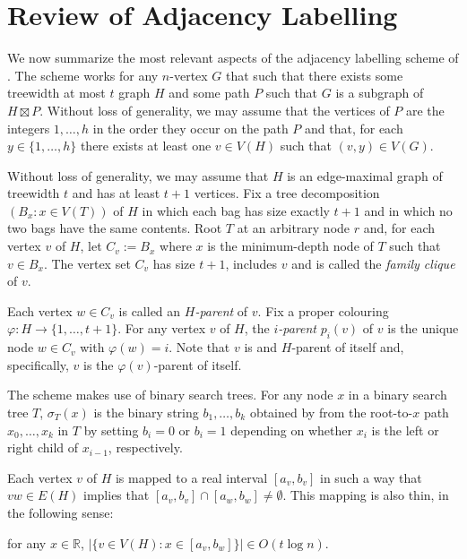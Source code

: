 \documentclass{patmorin}
\newcommand{\R}{\mathbb{R}}
\begin{document}
\section{Review of Adjacency Labelling}
\label{review}

We now summarize the most relevant aspects of the adjacency labelling scheme of \citet{dujmovic.esperet.ea:adjacency}.  The scheme works for any $n$-vertex $G$ that such that there exists some treewidth at most $t$ graph $H$ and some path $P$ such that $G$ is a subgraph of $H\boxtimes P$. Without loss of generality, we may assume that the vertices of $P$ are the integers $1,\ldots,h$ in the order they occur on the path $P$ and that, for each $y\in\{1,\ldots,h\}$ there exists at least one $v\in V(H)$ such that $(v,y)\in V(G)$.

Without loss of generality, we may assume that $H$ is an edge-maximal graph of treewidth $t$ and has at least $t+1$ vertices.  Fix a tree decomposition $(B_x:x\in V(T))$ of $H$ in which each bag has size exactly $t+1$ and in which no two bags have the same contents.  Root $T$ at an arbitrary node $r$ and, for each vertex $v$ of $H$, let $C_v:=B_x$ where $x$ is the minimum-depth node of $T$ such that $v\in B_x$.  The vertex set $C_v$ has size $t+1$, includes $v$ and is called the \emph{family clique} of $v$.

Each vertex $w\in C_v$ is called an \emph{$H$-parent} of $v$.  Fix a proper colouring $\varphi:H\to\{1,\ldots,t+1\}$.  For any vertex $v$ of $H$, the \emph{$i$-parent} $p_i(v)$ of $v$ is the unique node $w\in C_v$ with $\varphi(w)=i$.  Note that $v$ is and $H$-parent of itself and, specifically, $v$ is the $\varphi(v)$-parent of itself.

The scheme makes use of binary search trees.  For any node $x$ in a binary search tree $T$, $\sigma_T(x)$ is the binary string $b_1,\ldots,b_k$ obtained by from the root-to-$x$ path $x_0,\ldots,x_k$ in $T$ by setting $b_i=0$ or $b_i=1$ depending on whether $x_i$ is the left or right child of $x_{i-1}$, respectively.

Each vertex $v$ of $H$ is mapped to a real interval $[a_v,b_v]$ in such a way that $vw\in E(H)$ implies that $[a_v,b_v]\cap [a_w,b_w]\neq\emptyset$.  This mapping is also thin, in the following sense:

\begin{compactenum}[(P1)]
    \item for any $x\in \R$, $|\{v\in V(H): x\in[a_v,b_w]\}|\in O(t\log n)$.\label{thin}
\end{compactenum}
\end{document}
